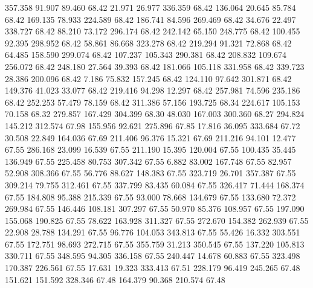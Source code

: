  357.358   91.907   89.460        68.42
  21.971   26.977  336.359        68.42
 136.064   20.645   85.784        68.42
 169.135   78.933  224.589        68.42
 186.741   84.596  269.469        68.42
  34.676   22.497  338.727        68.42
  88.210   73.172  296.174        68.42
 242.142   65.150  248.775        68.42
 100.455   92.395  298.952        68.42
  58.861   86.668  323.278        68.42
 219.294   91.321   72.868        68.42
  64.485  158.590  299.074        68.42
 107.237  105.343  290.381        68.42
 208.832  109.674  256.072        68.42
 248.180   27.564   39.393        68.42
 181.066  105.118  331.958        68.42
 339.723   28.386  200.096        68.42
   7.186   75.832  157.245        68.42
 124.110   97.642  301.871        68.42
 149.376   41.023   33.077        68.42
 219.416   94.298   12.297        68.42
 257.981   74.596  235.186        68.42
 252.253   57.479   78.159        68.42
 311.386   57.156  193.725        68.34
 224.617  105.153   70.158        68.32
 279.857  167.429  304.399        68.30
  48.030  167.003  300.360        68.27
 294.824  145.212  312.574        67.98
 155.956   92.621  275.896        67.85
  17.816   36.095  333.684        67.72
  30.508   22.849  164.036        67.69
 211.406   96.376   15.321        67.69
 211.216   94.101   12.477        67.55
 286.168   23.099   16.539        67.55
 211.190   15.395  120.004        67.55
 100.435   35.445  136.949        67.55
 225.458   80.753  307.342        67.55
   6.882   83.002  167.748        67.55
  82.957   52.908  308.366        67.55
  56.776   88.627  148.383        67.55
 323.719   26.701  357.387        67.55
 309.214   79.755  312.461        67.55
 337.799   83.435   60.084        67.55
 326.417   71.444  168.374        67.55
 184.808   95.388  215.339        67.55
  93.000   78.668  134.679        67.55
 133.680   72.372  269.984        67.55
 146.446  108.181  307.297        67.55
  50.970   85.376  108.957        67.55
 197.090  155.068  190.825        67.55
  78.622  163.928  311.327        67.55
 272.670  154.382  262.939        67.55
  22.908   28.788  134.291        67.55
  96.776  104.053  343.813        67.55
  55.426   16.332  303.551        67.55
 172.751   98.693  272.715        67.55
 355.759   31.213  350.545        67.55
 137.220  105.813  330.711        67.55
 348.595   94.305  336.158        67.55
 240.447   14.678   60.883        67.55
 323.498  170.387  226.561        67.55
  17.631   19.323  333.413        67.51
 228.179   96.419  245.265        67.48
 151.621  151.592  328.346        67.48
 164.379   90.368  210.574        67.48
